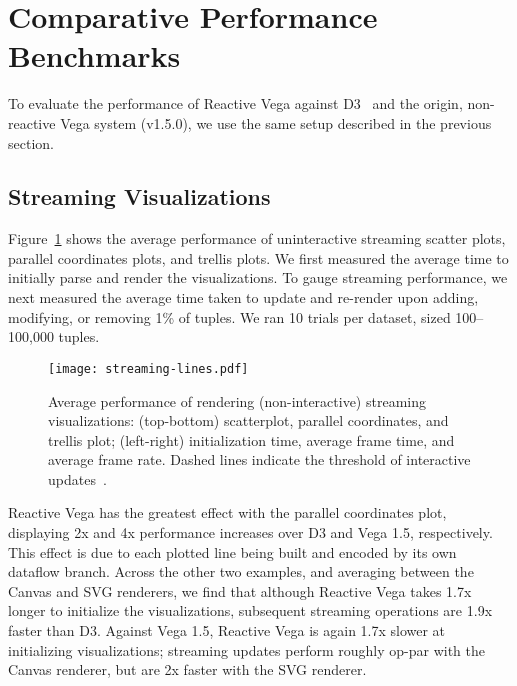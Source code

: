 
\vspace{-20pt}

\section{Comparative Performance Benchmarks}
\label{sec:vg:performance}

\vspace{-10pt}

To evaluate the performance of Reactive Vega against D3~\cite{bostock:d3} and
the origin, non-reactive Vega system (v1.5.0), we use the same setup described
in the previous section.

\vspace{-10pt}

\subsection{Streaming Visualizations}

\vspace{-7pt}

Figure~\ref{fig:vg:static_benchmark} shows the average performance of
uninteractive streaming scatter plots, parallel coordinates plots, and trellis
plots. We first measured the average time to initially parse and render the
visualizations. To gauge streaming performance, we next measured the average
time taken to update and re-render upon adding, modifying, or removing 1\% of
tuples. We ran 10 trials per dataset, sized 100--100,000 tuples.

\begin{figure}[t!]
  \centering
  \texttt{[image: streaming-lines.pdf]}
  \caption{Average performance of rendering (non-interactive) streaming visualizations:
(top-bottom) scatterplot, parallel coordinates, and trellis plot; (left-right)
initialization time, average frame time, and average frame rate. Dashed lines
indicate the threshold of interactive updates~\cite{card:modelhuman}.}
  \label{fig:vg:static_benchmark}
\end{figure}

Reactive Vega has the greatest effect with the parallel coordinates plot,
displaying 2x and 4x performance increases over D3 and Vega 1.5, respectively.
This effect is due to each plotted line being built and encoded by its own
dataflow branch. Across the other two examples, and averaging between the Canvas
and SVG renderers, we find that although Reactive Vega takes 1.7x longer to
initialize the visualizations, subsequent streaming operations are 1.9x faster
than D3. Against Vega 1.5, Reactive Vega is again 1.7x slower at initializing
visualizations; streaming updates perform roughly op-par with the Canvas
renderer, but are 2x faster with the SVG renderer.

